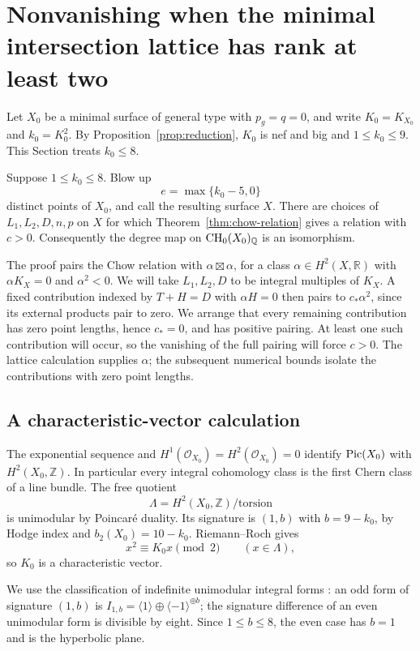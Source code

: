 \section{Nonvanishing when the minimal intersection lattice has rank at least two}
\label{sec:nonrank}

Let $X_0$ be a minimal surface of general type with $p_g=q=0$, and write
$K_0=K_{X_0}$ and $k_0=K_0^2$.  By Proposition~\ref{prop:reduction},
$K_0$ is nef and big and $1\leq k_0\leq9$.  This Section treats
$k_0\leq8$.

\begin{proposition}\label{prop:nonrank}
Suppose $1\leq k_0\leq8$.  Blow up
\[
 e=\max\{k_0-5,0\}
\]
distinct points of $X_0$, and call the resulting surface $X$.
There are choices of $L_1,L_2,D,n,p$ on $X$ for which
Theorem~\ref{thm:chow-relation} gives a relation with $c>0$.
Consequently the degree map on $\operatorname{CH}_0(X_0)_{\mathbb Q}$ is an isomorphism.
\end{proposition}

The proof pairs the Chow relation with $\alpha\boxtimes\alpha$, for a
class $\alpha\in H^2(X,\mathbb R)$ with $\alpha K_X=0$ and
$\alpha^2<0$.  We will take $L_1,L_2,D$ to be integral multiples of
$K_X$.  A fixed contribution indexed by $T+H=D$ with $\alpha H=0$
then pairs to $c_*\alpha^2$, since its external products pair to zero.
We arrange that every remaining contribution has zero point lengths,
hence $c_*=0$, and has positive pairing.  At least one such contribution
will occur, so the vanishing of the full pairing will force $c>0$.
The lattice calculation supplies $\alpha$; the subsequent numerical
bounds isolate the contributions with zero point lengths.

\subsection{A characteristic-vector calculation}

The exponential sequence and $H^1(\mathcal O_{X_0})=
H^2(\mathcal O_{X_0})=0$ identify $\operatorname{Pic}(X_0)$ with
$H^2(X_0,\mathbb Z)$.  In particular every integral cohomology class is
the first Chern class of a line bundle.  The free quotient
\[
 \Lambda=H^2(X_0,\mathbb Z)/\mathrm{torsion}
\]
is unimodular by Poincar\'e duality.  Its signature is $(1,b)$ with
$b=9-k_0$, by Hodge index and $b_2(X_0)=10-k_0$.
Riemann--Roch gives
\[
 x^2\equiv K_0x\pmod2\qquad(x\in\Lambda),
\]
so $K_0$ is a characteristic vector.

We use the classification of indefinite unimodular integral forms
\cite[Chapter~V, \S2.1, Corollary~1 to Theorem~2, and \S2.2,
Theorems~4--6]{SerreArithmetic}:
an odd form of signature $(1,b)$ is
$I_{1,b}=\langle1\rangle\oplus\langle-1\rangle^{\oplus b}$;
the signature difference of an even unimodular form is divisible by
eight.  Since $1\leq b\leq8$, the even case has $b=1$ and is the
hyperbolic plane.

